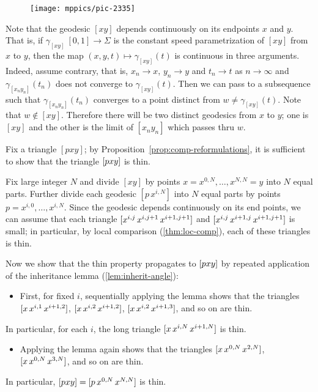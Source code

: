 \begin{figure}[h!]
\vskip0mm
\centering
\texttt{[image: mppics/pic-2335]}
\end{figure}

Note that the geodesic $[xy]$ depends continuously on its endpoints $x$ and $y$. 
That is, if $\gamma_{[xy]}\:[0,1]\to \Sigma$ is the constant speed parametrization of $[xy]$ from $x$ to $y$,
then the map $(x,y,t)\mapsto \gamma_{[xy]}(t)$ is continuous in three arguments.
Indeed, assume contrary, that is, $x_n\to x$, $y_n\to y$ and $t_n\to t$ as $n\to \infty$ and 
$\gamma_{[x_ny_n]}(t_n)$ does not converge to $\gamma_{[xy]}(t)$. 
Then we can pass to a subsequence such that $\gamma_{[x_ny_n]}(t_n)$ converges to a point distinct from $w\ne \gamma_{[xy]}(t)$.
Note that $w\notin [xy]$. 
Therefore there will be two distinct geodesics from $x$ to $y$;
one is $[xy]$ and the other is the limit of $[x_ny_n]$ which passes thru $w$.

Fix a triangle $[p x y]$; 
by Proposition~\ref{prop:comp-reformulations}, it is sufficient to show that the triangle $[p{x}{y}]$ is thin.   

Fix large integer $N$ and 
divide $[xy]$ by points $x=x^{0,N},\dots,x^{N,N}=y$ into $N$ equal parts.
Further divide each geodesic $[p\,x^{i,N}]$ into $N$ equal parts by points $p=x^{i,0},\dots,x^{i,N}$.
Since the geodesic depends continuously on its end points, we can assume that each triangle 
 $[x^{i,j}{\,x^{i,j+1}}{\,x^{i+1,j+1}}]$ and $[x^{i,j}{\,x^{i+1,j}}{\,x^{i+1,j+1}}]$ is small;
 in particular, by local comparison (\ref{thm:loc-comp}), each of these triangles is thin. 

Now we show that the thin property propagates to $[p{x}{y}]$ by repeated application of the inheritance lemma (\ref{lem:inherit-angle}):
\begin{itemize}
\item 
First, for fixed $i$, 
sequentially applying the lemma shows  that the triangles 
$[x{\,x^{i,1}}{\,x^{i+1,2}}]$, 
$[x{\,x^{i,2}}{\,x^{i+1,2}}]$, 
$[x{\,x^{i,2}}{\,x^{i+1,3}}]$,
and so on are thin. 
\end{itemize}
In particular, for each $i$, the long triangle $[x{\,x^{i,N}}{\,x^{i+1,N}}]$ is thin.
\begin{itemize} 
\item 
Applying the lemma again shows that the  triangles $[x{\,x^{0,N}}{\,x^{2,N}}]$, $[x{\,x^{0,N}}{\,x^{3,N}}]$, and so on are thin. 
\end{itemize}
In particular, $[p{x}{y}]=[p{\,x^{0,N}}{\,x^{N,N}}]$ is thin.
\qeds


